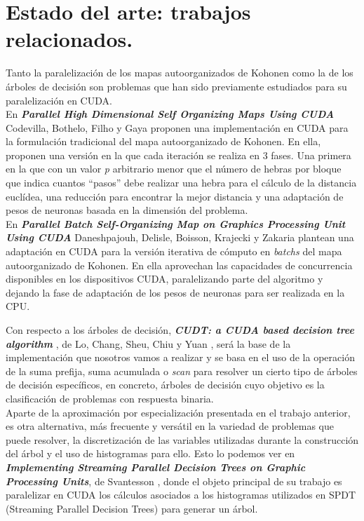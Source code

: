 \documentclass[a4paper,oneside,11pt,titlepage]{book}
\begin{document}
\section{Estado del arte: trabajos relacionados.}
Tanto la paralelización de los mapas autoorganizados de Kohonen como la de los árboles de decisión son problemas que han sido previamente estudiados para su paralelización en CUDA.\\

En \textbf{\textit{Parallel High Dimensional Self Organizing Maps Using CUDA}}  Codevilla, Bothelo, Filho y Gaya \cite{cudasomonline} proponen una implementación en CUDA para la formulación tradicional del mapa autoorganizado de Kohonen. En ella, proponen una versión en la que cada iteración se realiza en 3 fases. Una primera en la que con un valor \textit{p} arbitrario menor que el número de hebras por bloque que indica cuantos ``pasos'' debe realizar una hebra para el cálculo de la distancia euclídea, una reducción para encontrar la mejor distancia y una adaptación de pesos de neuronas basada en la dimensión del problema. \\

En \textbf{\textit{Parallel Batch Self-Organizing Map on Graphics Processing Unit Using CUDA}}  Daneshpajouh, Delisle, Boisson, Krajecki y Zakaria \cite{cudasombatch} plantean una adaptación en CUDA para la versión iterativa de cómputo en \textit{batchs} del mapa autoorganizado de Kohonen. En ella aprovechan las capacidades de concurrencia disponibles en los dispositivos CUDA, paralelizando parte del algoritmo y dejando la fase de adaptación de los pesos de neuronas para ser realizada en la CPU.

Con respecto a los árboles de decisión, \textbf{\textit{CUDT: a CUDA based decision tree algorithm}} , de Lo, Chang, Sheu, Chiu y Yuan \cite{cudt}, será la base de la implementación que nosotros vamos a realizar y se basa en el uso de la operación de la suma prefija, suma acumulada o \textit{scan} para resolver un cierto tipo de árboles de decisión específicos, en concreto, árboles de decisión cuyo objetivo es la clasificación de problemas con respuesta binaria.\\

Aparte de la aproximación por especialización presentada en el trabajo anterior, es otra alternativa, más frecuente y versátil en la variedad de problemas que puede resolver, la discretización de las variables utilizadas durante la construcción del árbol y el uso de histogramas para ello. Esto lo podemos ver en \textbf{\textit{Implementing Streaming Parallel Decision Trees on Graphic Processing Units}}, de Svantesson \cite{svatensson}, donde el objeto principal de su trabajo es paralelizar en CUDA los cálculos asociados a los histogramas utilizados en SPDT (Streaming Parallel Decision Trees) para generar un árbol.
\end{document}
